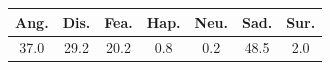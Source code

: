 \begin{tabular}{ccccccc}
\toprule
Ang. & Dis. & Fea. & Hap. & Neu. & Sad. & Sur. \\
\midrule
37.0 & 29.2 & 20.2 & 0.8 & 0.2 & 48.5 & 2.0 \\
\bottomrule
\end{tabular}
